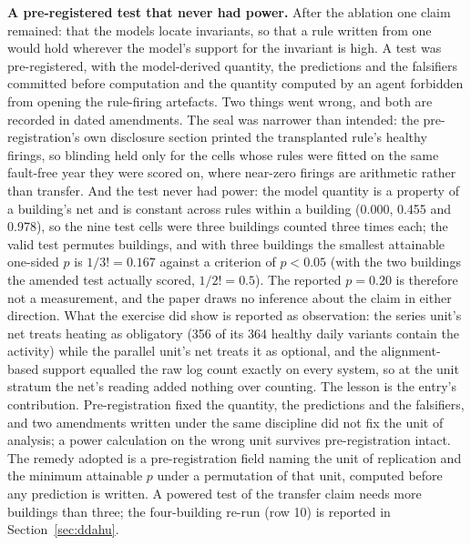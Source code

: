 \documentclass[11pt,letterpaper]{article}
\begin{document}
\textbf{A pre-registered test that never had power.} After the ablation one claim remained: that the models locate invariants, so that a rule written from one would hold wherever the model's support for the invariant is high. A test was pre-registered, with the model-derived quantity, the predictions and the falsifiers committed before computation and the quantity computed by an agent forbidden from opening the rule-firing artefacts. Two things went wrong, and both are recorded in dated amendments. The seal was narrower than intended: the pre-registration's own disclosure section printed the transplanted rule's healthy firings, so blinding held only for the cells whose rules were fitted on the same fault-free year they were scored on, where near-zero firings are arithmetic rather than transfer. And the test never had power: the model quantity is a property of a building's net and is constant across rules within a building (0.000, 0.455 and 0.978), so the nine test cells were three buildings counted three times each; the valid test permutes buildings, and with three buildings the smallest attainable one-sided $p$ is $1/3! = 0.167$ against a criterion of $p < 0.05$ (with the two buildings the amended test actually scored, $1/2! = 0.5$). The reported $p = 0.20$ is therefore not a measurement, and the paper draws no inference about the claim in either direction. What the exercise did show is reported as observation: the series unit's net treats heating as obligatory (356 of its 364 healthy daily variants contain the activity) while the parallel unit's net treats it as optional, and the alignment-based support equalled the raw log count exactly on every system, so at the unit stratum the net's reading added nothing over counting. The lesson is the entry's contribution. Pre-registration fixed the quantity, the predictions and the falsifiers, and two amendments written under the same discipline did not fix the unit of analysis; a power calculation on the wrong unit survives pre-registration intact. The remedy adopted is a pre-registration field naming the unit of replication and the minimum attainable $p$ under a permutation of that unit, computed before any prediction is written. A powered test of the transfer claim needs more buildings than three; the four-building re-run (row 10) is reported in Section~\ref{sec:ddahu}.
\end{document}

